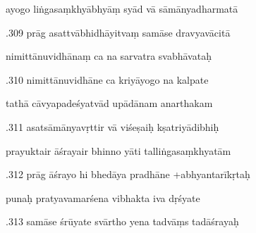 \documentclass[article,12pt,a4paper]{memoir}%
\newcounter{parCount}
\begin{document}
	  
	  \pstart \leavevmode%
	ayogo liṅgasaṃkhyābhyāṃ syād vā sāmānyadharmatā 
	{}
	\pend%
      

	  
	  \pstart {}.309 prāg asattvābhidhāyitvaṃ samāse dravyavācitā 
	{}
	\pend%
      

	  
	  \pstart \leavevmode%
	nimittānuvidhānaṃ ca na sarvatra svabhāvataḥ 
	{}
	\pend%
      

	  
	  \pstart {}.310 nimittānuvidhāne ca kriyāyogo na kalpate 
	{}
	\pend%
      

	  
	  \pstart \leavevmode%
	tathā cāvyapadeśyatvād upādānam anarthakam 
	{}
	\pend%
      

	  
	  \pstart {}.311 asatsāmānyavṛttir vā viśeṣaiḥ kṣatriyādibhiḥ 
	{}
	\pend%
      

	  
	  \pstart \leavevmode%
	prayuktair āśrayair bhinno yāti talliṅgasaṃkhyatām 
	{}
	\pend%
      

	  
	  \pstart {}.312 prāg āśrayo hi bhedāya pradhāne +abhyantarīkṛtaḥ 
	{}
	\pend%
      

	  
	  \pstart \leavevmode%
	punaḥ pratyavamarśena vibhakta iva dṛśyate 
	{}
	\pend%
      

	  
	  \pstart {}.313 samāse śrūyate svārtho yena tadvāṃs tadāśrayaḥ 
	{}
	\pend%
      
\end{document}
